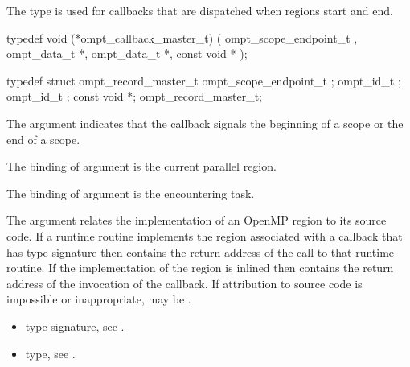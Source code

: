 \label{sec:ompt_callback_master_t}

\summary
The  type is used for callbacks that are 
dispatched when  regions start and end.

\format
\begin{ccppspecific}
\begin{omptCallback}
typedef void (*ompt_callback_master_t) (
  ompt_scope_endpoint_t ,
  ompt_data_t *,
  ompt_data_t *,
  const void *
);
\end{omptCallback}
\end{ccppspecific}

\record
\begin{ccppspecific}
\begin{omptRecord}
typedef struct ompt_record_master_t {
  ompt_scope_endpoint_t ;
  ompt_id_t ;
  ompt_id_t ;
  const void *;
} ompt_record_master_t;
\end{omptRecord}
\end{ccppspecific}

\argdesc
The  argument indicates that the callback signals
the beginning of a scope or the end of a scope.

The binding of argument  is the current parallel region.

The binding of argument  is the encountering task.

The  argument relates the implementation of an OpenMP region
to its source code. If a runtime routine implements the region associated with
a callback that has type signature  then
 contains the return address of the call to that runtime routine.
If the implementation of the region is inlined then  contains the
return address of the invocation of the callback. If attribution to source code
is impossible or inappropriate, may be .

\crossreferences
\begin{itemize}
\item {} type signature, see .
\item {} type, see .
\end{itemize}





